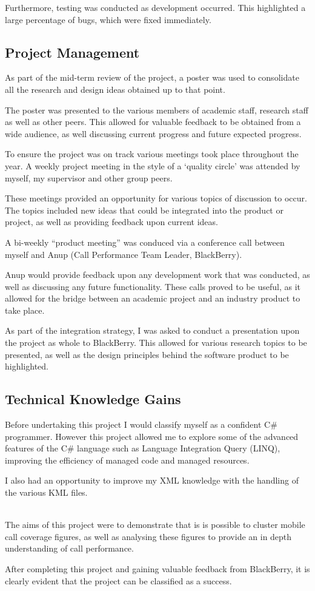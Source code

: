 Furthermore, testing was conducted as development occurred. This highlighted a
large percentage of bugs, which were fixed immediately.

\subsection{Project Management}
As part of the mid-term review of the project, a poster was used to consolidate
all the research and design ideas obtained up to that point. 

The poster was presented to the various members of academic staff, research 
staff as well as other peers. This allowed for valuable feedback to be obtained
from a wide audience, as well discussing current progress and future expected 
progress.

To ensure the project was on track various meetings took place throughout the 
year. A weekly project meeting in the style of a `quality circle' was attended
by myself, my supervisor and other group peers. 

These meetings provided an opportunity for various topics of discussion to 
occur. The topics included new ideas that could be integrated into the product 
or project, as well as providing feedback upon current ideas. 

A bi-weekly ``product meeting'' was conduced via a conference call between 
myself and Anup (Call Performance Team Leader, BlackBerry).

Anup would provide feedback upon any development work that was conducted, as 
well as discussing any future functionality. These calls proved to be useful, 
as it allowed for the bridge between an academic project and an industry 
product to take place.

As part of the integration strategy, I was asked to conduct a presentation upon
the project as whole to BlackBerry. This allowed for various research topics to
be presented, as well as the design principles behind the software product to 
be highlighted. 

\subsection{Technical Knowledge Gains}
Before undertaking this project I would classify myself as a confident C\# 
programmer. However this project allowed me to explore some of the advanced 
features of the C\# language such as Language Integration Query (LINQ), 
improving the efficiency of managed code and managed resources.

I also had an opportunity to improve my XML knowledge with the handling of the 
various KML files.

~\\

The aims of this project were to demonstrate that is is possible to cluster 
mobile call coverage figures, as well as analysing these figures to provide an 
in depth understanding of call performance. 

After completing this project and gaining valuable feedback from BlackBerry, it
is clearly evident that the project can be classified as a success.